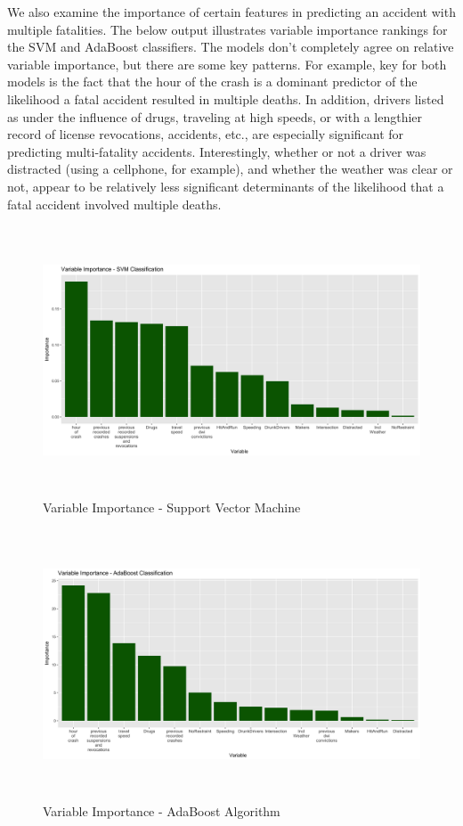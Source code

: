 \documentclass[11pt, oneside,titlepage]{article}   	%
\begin{document}
We also examine the importance of certain features in predicting an accident with multiple fatalities. The below output illustrates variable importance rankings for the SVM and AdaBoost classifiers. The models don't completely agree on relative variable importance, but there are some key patterns. For example, key for both models is the fact that the hour of the crash is a dominant predictor of the likelihood a fatal accident resulted in multiple deaths. In addition, drivers listed as under the influence of drugs, traveling at high speeds, or with a lengthier record of license revocations, accidents, etc., are especially significant for predicting multi-fatality accidents. Interestingly, whether or not a driver was distracted (using a cellphone, for example), and whether the weather was clear or not, appear to be relatively less significant determinants of the likelihood that a fatal accident involved multiple deaths.\\

\begin{figure}[H]
\centering
  \includegraphics[width=15cm,height=8cm,keepaspectratio]{ImportancePlot_SVM.png}
\caption{Variable Importance - Support Vector Machine}
\end{figure}

\begin{figure}[H]
\centering
  \includegraphics[width=15cm,height=8cm,keepaspectratio]{ImportancePlot_ADABoost.png}
\caption{Variable Importance - AdaBoost Algorithm}
\end{figure}
\end{document}
